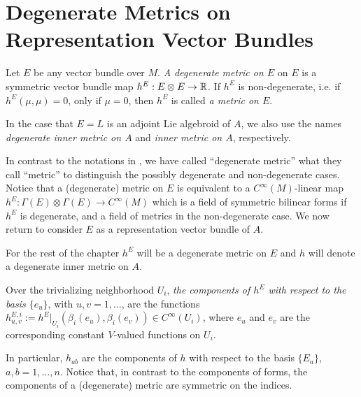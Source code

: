 \section{Degenerate Metrics on Representation Vector Bundles}
\label{chIntegrationSectionMetricsRepresentationAssociated}

\begin{definition}\label{definitionDegenerateMetricGeneralEInner}
    Let $E$ be any vector bundle over $M$. \emph{A degenerate metric on $E$} on $E$ is a symmetric vector bundle map $h^E: E \otimes E \to \mathbb{R}$. If $h^E$ is non-degenerate, i.e. if $h^E(\mu, \mu) = 0$, only if $\mu = 0$, then $h^E$ is called \emph{a metric on $E$}.
    
    \noindent In the case that $E = L$ is an adjoint Lie algebroid of $A$, we also use the names \emph{degenerate inner metric on $A$} and \emph{inner metric on $A$}, respectively.
\end{definition}

In contrast to the notations in \cite{Fournel2011, Fournel2013}, we have called ``degenerate metric'' what they call ``metric'' to distinguish the possibly degenerate and non-degenerate cases. Notice that a (degenerate) metric on $E$ is equivalent to a $C^\infty(M)$-linear map $h^E: \Gamma(E) \otimes \Gamma(E) \to C^\infty(M)$ which is a field of symmetric bilinear forms if $h^E$ is degenerate, and a field of metrics in the non-degenerate case. We now return to consider $E$ as a representation vector bundle of $A$.

For the rest of the chapter  $h^E$ will be a degenerate metric on $E$ and $h$ will denote a degenerate inner metric on $A$.

\begin{definition}
    Over the trivializing neighborhood $U_i$, \emph{the components of $h^E$ with respect to the basis $\{e_u\}$}, with $u, v = 1, \dots$, are the functions $h^{E, i}_{u, v}:= h^E|_{U_i}(\beta_i(e_u),\beta_i(e_v)) \in C^\infty(U_i)$, where $e_u$ and $e_v$ are the corresponding constant $V$-valued functions on $U_i$.
\end{definition}

In particular, $h_{ab}$ are the components of $h$ with respect to the basis $\{E_a\}$, $a, b = 1, \dots, n$. Notice that, in contrast to the components of forms, the components of a (degenerate) metric are symmetric on the indices.

